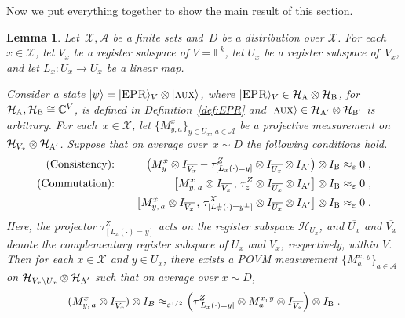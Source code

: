 \documentclass[11pt]{article}
\newtheorem{lemma}[theorem]{Lemma}
\theoremstyle{definition}
\newcommand{\ket}[1]{|#1\rangle}
\newcommand{\Id}{\ensuremath{I}}
\newcommand{\C}{\ensuremath{\mathbb{C}}}
\newcommand{\F}{\ensuremath{\mathbb{F}}}
\newcommand{\mH}{\ensuremath{\mathcal{H}}}
\newcommand{\eps}{\varepsilon}
\newcommand{\labelstyle}[1]{\ensuremath{\textsc{#1}}\xspace}
\newcommand{\EPR}{\labelstyle{EPR}}
\newcommand{\aux}{\labelstyle{aux}}
\newcommand{\alice}{\labelstyle{A}}
\newcommand{\bob}{\labelstyle{B}}
\renewcommand{\cal}[1]{\mathcal{#1}}
\begin{document}
Now we put everything together to show the main result of this section. 

\begin{lemma}
  \label{lem:mixing}
  Let~$\cal{X},\cal{A}$ be a finite sets and~$D$ be a distribution over
  $\cal{X}$.
  For each~$x \in \cal{X}$, let $V_x$ be a register subspace of $V = \F^k$, let
  $U_x$ be a register subspace of~$V_x$, and let $L_x:U_x \to U_x$ be a linear
  map.

  Consider a state $\ket{\psi} = \ket{\EPR}_V \otimes \ket{\aux}$, where
  $\ket{\EPR}_{V} \in \mH_\alice \otimes \mH_\bob$, for $\mH_\alice,\mH_\bob
  \cong \C^{V}$, is defined in Definition~\ref{def:EPR} and $\ket{\aux}\in
  \mH_{\alice'} \otimes \mH_{\bob'}$ is arbitrary.
  For each~$x \in \cal{X}$, let $\{M^{x}_{y,a}\}_{y \in U_x,\, a\in \cal{A}}$ be
  a projective measurement on $\mH_{V_x} \otimes \mH_{\alice'}$.
  Suppose that on average over~$x \sim D$ the following conditions hold.
  \begin{alignat*}{2}
    \text{(Consistency):} && \quad
    \bigl( M^{x}_{y} \otimes \Id_{\overline{V_x}} - \tau^Z_{[L_x(\cdot) = y]}
    \otimes \Id_{\overline{U_x}} \otimes \Id_{\alice'}\bigr) \otimes \Id_\bob
    \approx_\eps 0\;, &\\
    \text{(Commutation):} && \quad
      \bigl[ M^{x}_{y,\, a} \otimes \Id_{\overline{V_x}}\,,\, \tau^Z_{z} \otimes
      \Id_{\overline{U_x}}   \otimes \Id_{\alice'} \bigr] \otimes
      \Id_\bob\approx_\eps 0\;, &\\
      && \quad
      \bigl[ M^{x}_{y,\, a}\otimes \Id_{\overline{V_x}}\,,\,
      \tau^X_{[L_x^\perp(\cdot) = y^\perp]}  \otimes \Id_{\overline{U_x}}
      \otimes \Id_{\alice'} \bigr]  \otimes \Id_\bob  \approx_\eps 0\;.&
  \end{alignat*}
  Here, the projector $\tau^Z_{[L_x(\cdot) = y]}$ acts on the register subspace
  $\mH_{U_x}$, and $\overline{U_x}$ and $\overline{V_x}$ denote the
  complementary register subspace of $U_x$ and $V_x$, respectively, within $V$.
  Then for each $x\in \cal{X}$ and $y \in U_x$, there exists a POVM measurement
  $\bigl\{ M^{x,\, y}_a \bigr\}_{a \in \cal{A}} $ on $\mH_{V_x \setminus
    U_x}\otimes \mH_{\alice'}$ such that on average over $x \sim D$,
  \begin{equation*}
    (M^{x}_{y,\, a} \otimes \Id_{\overline{V_x}}) \otimes \Id_{B}
    \approx_{\eps^{1/2}} \Bigl(\tau^Z_{[L_x(\cdot) = y]} \otimes M^{x,\, y}_a
    \otimes \Id_{\overline{V_x}}\Bigr) \otimes \Id_\bob\;.
  \end{equation*}
\end{lemma}
\end{document}
